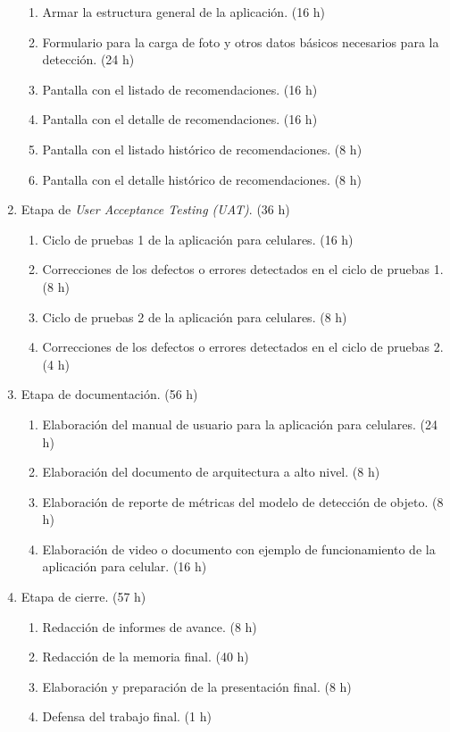 \documentclass[
11pt, %
]{charter}
\begin{document}
\begin{enumerate}
	\begin{enumerate}
	\item Armar la estructura general de la aplicación. (16 h)
	\item Formulario para la carga de foto y otros datos básicos necesarios para la detección. (24 h)
	\item Pantalla con el listado de recomendaciones. (16 h)
	\item Pantalla con el detalle de recomendaciones. (16 h)
	\item Pantalla con el listado  histórico de recomendaciones. (8 h)
	\item Pantalla con el detalle histórico de recomendaciones. (8 h)
	\end{enumerate}
\item Etapa de \textit{User Acceptance Testing (UAT)}. (36 h)
	\begin{enumerate}
		\item Ciclo de pruebas 1 de la aplicación para celulares. (16 h)
		\item Correcciones de los defectos o errores detectados en el ciclo de pruebas 1. (8 h)
		\item Ciclo de pruebas 2 de la aplicación para celulares. (8 h)
		\item Correcciones de los defectos o errores detectados en el ciclo de pruebas 2. (4 h)
	\end{enumerate}
	
\item Etapa de documentación. (56 h)
	\begin{enumerate}	
\item Elaboración del manual de usuario para la aplicación para celulares. (24 h)
\item Elaboración del documento de arquitectura a alto nivel. (8 h)
\item Elaboración de reporte de métricas del modelo de detección de objeto. (8 h)
\item Elaboración de video o documento con ejemplo de funcionamiento de la aplicación para celular. (16 h)
\end{enumerate}
\item Etapa de cierre. (57 h)
	\begin{enumerate}
		\item Redacción de informes de avance. (8 h)
		\item Redacción de la memoria final. (40 h)
		\item Elaboración y preparación de la presentación final. (8 h)
		\item Defensa del trabajo final. (1 h)
	\end{enumerate}
\end{enumerate}
\end{document}
